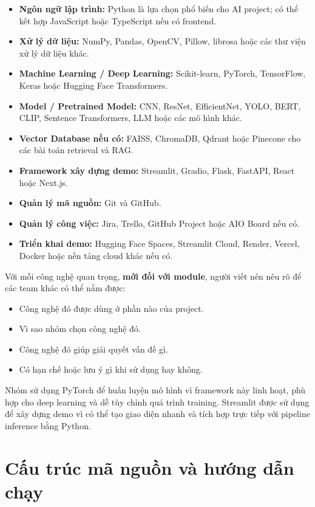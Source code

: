 \documentclass[12pt]{ai_conquer2026}
\begin{document}
\begin{itemize}
\item \textbf{Ngôn ngữ lập trình:} Python là lựa chọn phổ biến cho AI project; có thể kết hợp JavaScript hoặc TypeScript nếu có frontend.
\item \textbf{Xử lý dữ liệu:} NumPy, Pandas, OpenCV, Pillow, librosa hoặc các thư viện xử lý dữ liệu khác.
\item \textbf{Machine Learning / Deep Learning:} Scikit-learn, PyTorch, TensorFlow, Keras hoặc Hugging Face Transformers.
\item \textbf{Model / Pretrained Model:} CNN, ResNet, EfficientNet, YOLO, BERT, CLIP, Sentence Transformers, LLM hoặc các mô hình khác.
\item \textbf{Vector Database nếu có:} FAISS, ChromaDB, Qdrant hoặc Pinecone cho các bài toán retrieval và RAG.
\item \textbf{Framework xây dựng demo:} Streamlit, Gradio, Flask, FastAPI, React hoặc Next.js.
\item \textbf{Quản lý mã nguồn:} Git và GitHub.
\item \textbf{Quản lý công việc:} Jira, Trello, GitHub Project hoặc AIO Board nếu có.
\item \textbf{Triển khai demo:} Hugging Face Spaces, Streamlit Cloud, Render, Vercel, Docker hoặc nền tảng cloud khác nếu có.
\end{itemize}

Với mỗi công nghệ quan trọng, \textbf{mới đối với module}, người viết nên nêu rõ để các team khác có thể nắm được:
\begin{itemize}
\item Công nghệ đó được dùng ở phần nào của project.
\item Vì sao nhóm chọn công nghệ đó.
\item Công nghệ đó giúp giải quyết vấn đề gì.
\item Có hạn chế hoặc lưu ý gì khi sử dụng hay không.
\end{itemize}




\begin{aivncodebox}[Ví dụ:]
Nhóm sử dụng PyTorch để huấn luyện mô hình vì framework này linh hoạt, phù hợp cho deep learning và dễ tùy chỉnh quá trình training. Streamlit được sử dụng để xây dựng demo vì có thể tạo giao diện nhanh và tích hợp trực tiếp với pipeline inference bằng Python.
\end{aivncodebox}

\section{Cấu trúc mã nguồn và hướng dẫn chạy}
\end{document}

